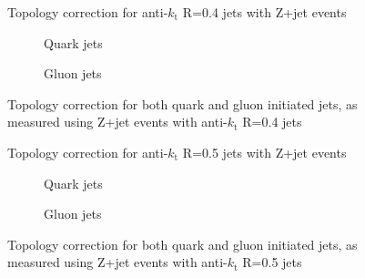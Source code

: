 \clearpage
\begin{figure}[!ht]
 \centering
 \caption[Topology correction for anti-$k_{\mathrm t}$ R=0.4 jets with Z+jet events]
 {\small Topology correction for anti-$k_{\mathrm t}$ R=0.4 jets with Z+jet events}
 \label{plot:ZJetTopoCorr4App}
\end{figure}

\begin{figure}[!ht]
 \centering
 \begin{subfigure}{.5\textwidth}
  \centering
  \caption{Quark jets}
 \end{subfigure}%
 \begin{subfigure}{.5\textwidth}
  \centering
  \caption{Gluon jets}
 \end{subfigure}
 \caption[Quark/gluon jet topology correction, anti-$k_{\mathrm t}$ R=0.4, Z+jet]
 {\small Topology correction for both quark and gluon initiated jets, as measured using Z+jet events with anti-$k_{\mathrm t}$ R=0.4 jets}
 \label{plot:ZJetTopoCorrFlav4App}
\end{figure}

\clearpage
\begin{figure}[!ht]
 \centering
 \caption[Topology correction for anti-$k_{\mathrm t}$ R=0.5 jets with Z+jet events]
 {\small Topology correction for anti-$k_{\mathrm t}$ R=0.5 jets with Z+jet events}
 \label{plot:ZJetTopoCorr5App}
\end{figure}

\begin{figure}[!ht]
 \centering
 \begin{subfigure}{.5\textwidth}
  \centering
  \caption{Quark jets}
 \end{subfigure}%
 \begin{subfigure}{.5\textwidth}
  \centering
  \caption{Gluon jets}
 \end{subfigure}
 \caption[Quark/gluon jet topology correction, anti-$k_{\mathrm t}$ R=0.5, Z+jet]
 {\small Topology correction for both quark and gluon initiated jets, as measured using Z+jet events with anti-$k_{\mathrm t}$ R=0.5 jets}
 \label{plot:ZJetTopoCorrFlav5App}
\end{figure}

